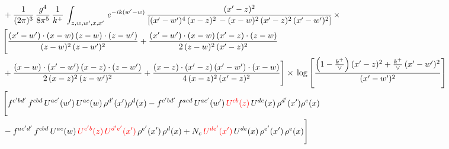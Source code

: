 \documentclass[9pt]{article}
\numberwithin{equation}{section}
\begin{document}
\begin{align}
&  + \frac{1}{(2\pi)^{3}}\, \frac{g^{4}}{8\pi^{5}}\,\frac{1}{k^{+}}\,\int_{z,w,w^{\prime},x,x'}\, e^{-ik(w^{\prime}-w)}\, \frac{(x'-z)^{2}}{\left[(x'-w')^{4}\,(x-z)^{2}\, - (x-w)^{2}\, (x'-z)^{2}\,(x'-w')^{2}\right]}\,  \times\notag \\ & \Bigg[\frac{(x'-w')\cdot (x-w)\, (z-w)\cdot (z-w')}{(z-w)^{2}\, (z-w')^{2}}+\frac{(x'-w')\cdot (x-w)\, (x'-z)\cdot (z-w)}{2\, (z-w)^{2}\, (x'-z)^{2}}\notag \\ & +\frac{(x-w)\cdot (x'-w')\, (x-z)\cdot (z-w')}{2\, (x-z)^{2}\, (z-w')^{2}}+\frac{(x-z)\cdot (x'-z)\, (x'-w')\cdot (x-w)}{4\, (x-z)^{2}\, (x'-z)^{2}}\Bigg] \times\,\log{\left[\frac{\left(1-\frac{k^{+}}{\vee}\right)(x'-z)^{2}+\frac{k^{+}}{\vee}\,(x'-w')^{2}}{(x'-w')^{2}}\right]} \notag \\ & \Bigg[f^{c'bd'}\,f^{cbd}\, U^{ac'}(w')\,U^{ac}(w)\,\rho^{d'}(x')\rho^{d}(x)- f^{c'bd'}\,f^{acd}\,U^{ac'}(w')\,{\color{red}U^{cb}(z)}\,U^{de}(x)\,\rho^{d'}(x')\rho^{e}(x) \notag \\ & -f^{ac'd'}\,f^{cbd}\,U^{ac}(w)\,{\color{red}U^{c'b}(z)\,U^{d'e'}(x')}\,\rho^{e'}(x')\,\rho^{d}(x) +N_{c}\,{\color{red}U^{de'}(x')}\,U^{de}(x)\,\rho^{e'}(x')\,\rho^{e}(x)\Bigg]
\end{align}
\end{document}
